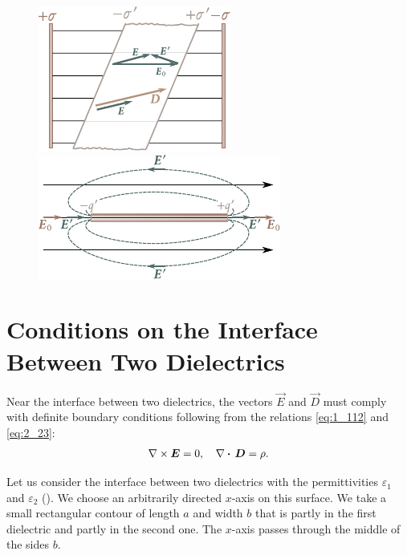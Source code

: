 \begin{figure}[t]
	\begin{minipage}[t]{0.46\linewidth}
		\begin{center}
			\includegraphics[scale=1.2]{figures/ch_02/fig_2_7.pdf}
			\caption[]{}
			\label{fig:2_7}
		\end{center}
	\end{minipage}
	\hfill{}%
	\begin{minipage}[t]{0.5\linewidth}
		\begin{center}
			\includegraphics[scale=1.2]{figures/ch_02/fig_2_8.pdf}
			\caption[]{}
			\label{fig:2_8}
		\end{center}
	\end{minipage}
\vspace{-0.4cm}
\end{figure}

\section{Conditions on the Interface Between Two Dielectrics}\label{sec:2_7}

Near the interface between two dielectrics, the vectors $\vec{E}$ and $\vec{D}$ must comply with definite boundary conditions following from the relations \eqref{eq:1_112} and \eqref{eq:2_23}:
\begin{equation*}
    \nabla\times\boldsymbol{E} = 0,\quad \nabla\boldsymbol{\cdot}\,\boldsymbol{D} = \rho.
\end{equation*}

Let us consider the interface between two dielectrics with the permittivities $\varepsilon_1$ and $\varepsilon_2$ (). We choose an arbitrarily directed $x$-axis on this surface. We take a small rectangular contour of length $a$ and width $b$ that is partly in the first dielectric and partly in the second one. The $x$-axis passes through the middle of the sides $b$.

